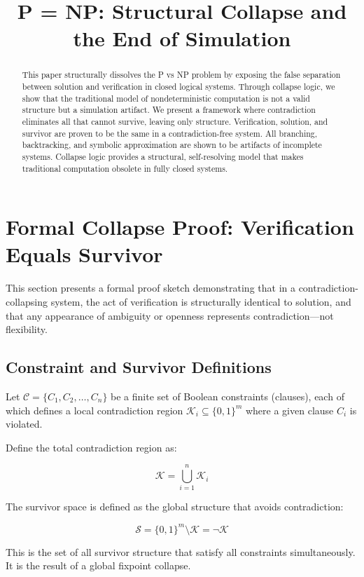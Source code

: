 \documentclass[12pt]{article}
\title{\textbf{P = NP: Structural Collapse and the End of Simulation}}
\author{}
\date{}
\begin{document}
\maketitle

\begin{abstract}
This paper structurally dissolves the P vs NP problem by exposing the false separation between solution and verification in closed logical systems. Through collapse logic, we show that the traditional model of nondeterministic computation is not a valid structure but a simulation artifact. We present a framework where contradiction eliminates all that cannot survive, leaving only structure. Verification, solution, and survivor are proven to be the same in a contradiction-free system. All branching, backtracking, and symbolic approximation are shown to be artifacts of incomplete systems. Collapse logic provides a structural, self-resolving model that makes traditional computation obsolete in fully closed systems.
\end{abstract}

\section{Formal Collapse Proof: Verification Equals Survivor}

This section presents a formal proof sketch demonstrating that in a contradiction-collapsing system, the act of verification is structurally identical to solution, and that any appearance of ambiguity or openness represents contradiction—not flexibility.

\subsection{Constraint and Survivor Definitions}

Let $\mathcal{C} = \{C_1, C_2, \dots, C_n\}$ be a finite set of Boolean constraints (clauses), each of which defines a local contradiction region $\mathcal{K}_i \subseteq \{0,1\}^m$ where a given clause $C_i$ is violated.

Define the total contradiction region as:

\[
\mathcal{K} = \bigcup_{i=1}^n \mathcal{K}_i
\]

The survivor space is defined as the global structure that avoids contradiction:

\[
\mathcal{S} = \{0,1\}^m \setminus \mathcal{K} = \neg \mathcal{K}
\]

This is the set of all survivor structure that satisfy all constraints simultaneously. It is the result of a global fixpoint collapse.
\end{document}
